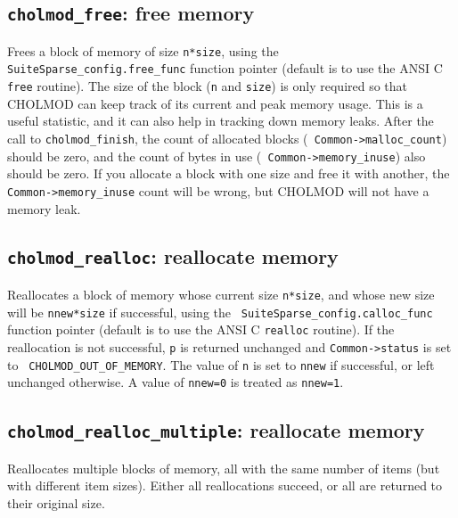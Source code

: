 \documentclass[11pt]{article}
\begin{document}
\subsection{{\tt cholmod\_free}: free memory}


Frees a block of memory of size {\tt n*size}, using the {\tt
SuiteSparse\_config.free\_func} function pointer (default is to use the ANSI C
{\tt free} routine).  The size of the block ({\tt n} and {\tt size}) is only
required so that CHOLMOD can keep track of its current and peak memory usage.
This is a useful statistic, and it can also help in tracking down memory leaks.
After the call to {\tt cholmod\_finish}, the count of allocated blocks ({\tt
Common->malloc\_count}) should be zero, and the count of bytes in use ({\tt
Common->memory\_inuse}) also should be zero.  If you allocate a block with one
size and free it with another, the {\tt Common->memory\_inuse} count will be
wrong, but CHOLMOD will not have a memory leak.

\subsection{{\tt cholmod\_realloc}: reallocate memory}


Reallocates a block of memory whose current size {\tt n*size}, and whose new
size will be {\tt nnew*size} if successful, using the {\tt
SuiteSparse\_config.calloc\_func} function pointer (default is to use the ANSI
C {\tt realloc} routine).  If the reallocation is not successful, {\tt p} is
returned unchanged and {\tt Common->status} is set to {\tt
CHOLMOD\_OUT\_OF\_MEMORY}.  The value of {\tt n} is set to {\tt nnew} if
successful, or left unchanged otherwise.  A value of {\tt nnew=0} is treated as
{\tt nnew=1}.

\subsection{{\tt cholmod\_realloc\_multiple}: reallocate memory}


Reallocates multiple blocks of memory, all with the same number of items (but
with different item sizes).  Either all reallocations succeed, or all are
returned to their original size.
\end{document}
